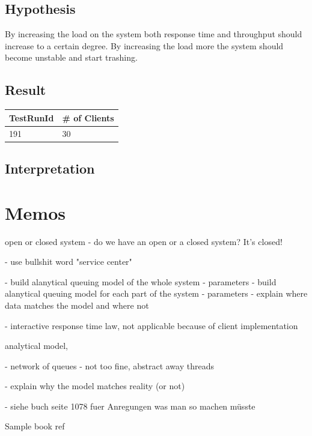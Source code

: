 \documentclass[a4paper]{article}
\begin{document}
\subsection{Hypothesis}

By increasing the load on the system both response time and throughput should increase to
a certain degree. By increasing the load more the system should become unstable and start
trashing.

\subsection{Result}


\begin{tabular}{|l|l|}
\hline 
TestRunId & \# of Clients \\ 
\hline 
191 & 30 \\ 
\hline 
\end{tabular} 

\subsection{Interpretation}



\pagebreak

\section{Memos}

open or closed system
- do we have an open or a closed system? It's closed!

- use bullshit word "service center"

- build alanytical queuing model of the whole system
  - parameters
- build alanytical queuing model for each part of the system
  - parameters
- explain where data matches the model and where not

- interactive response time law, not applicable because of client implementation

analytical model, 


- network of queues
  - not too fine, abstract away threads
  
  
- explain why the model matches reality (or not)


- siehe buch seite 1078 fuer Anregungen was man so machen müsste

Sample book ref \cite[Page 556]{Raj}




\end{document}
